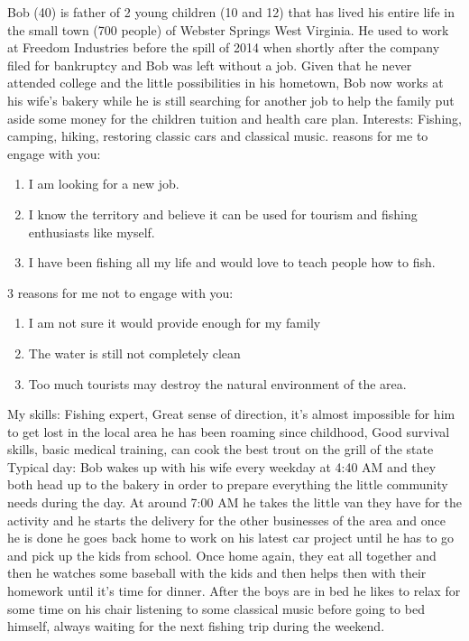 Bob (40) is father of 2 young children (10 and 12) that has lived his entire life in the small town (700 people) of Webster Springs West Virginia. He used to work at Freedom Industries before the spill of 2014 when shortly after the company filed for bankruptcy and Bob was left without a job. Given that he never attended college and the little possibilities in his hometown, Bob now works at his wife's bakery while he is still searching for another job to help the family put aside some money for the children tuition and health care plan.
\newline
Interests: Fishing, camping, hiking, restoring classic cars and classical music. 
 reasons for me to engage with you:
\begin{enumerate} 
\item I am looking for a new job. 
\item I know the territory and believe it can be used for tourism and fishing enthusiasts like myself. 
\item I have been fishing all my life and would love to teach people how to fish. 
\end{enumerate}
3 reasons for me not to engage with you:
\begin{enumerate}
\item I am not sure it would provide enough for my family 
\item The water is still not completely clean 
\item Too much tourists may destroy the natural environment of the area. 
\end{enumerate}
My skills: 
\newline
Fishing expert, Great sense of direction, it's almost impossible for him to get lost in the local area he has been roaming since childhood, Good survival skills, basic medical training, can cook the best trout on the grill of the state \newline
Typical day: 
\newline
Bob wakes up with his wife every weekday at 4:40 AM and they both head up to the bakery in order to prepare everything the little community needs during the day. At around 7:00 AM he takes the little van they have for the activity and he starts the delivery for the other businesses of the area and once he is done he goes back home to work on his latest car project until he has to go and pick up the kids from school. Once home again, they eat all together and then he watches some baseball with the kids and then helps then with their homework until it's time for dinner. After the boys are in bed he likes to relax for some time on his chair listening to some classical music before going to bed himself, always waiting for the next fishing trip during the weekend. \newline
